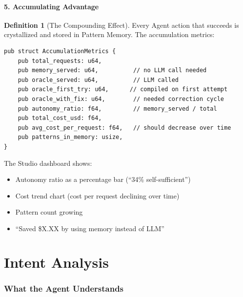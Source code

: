 \documentclass[11pt,a4paper,twoside]{article}
\theoremstyle{definition}
\newtheorem{definition}{Definition}[section]
\theoremstyle{remark}
\begin{document}
\subsection{5. Accumulating Advantage}\label{sec:accumulate}

\begin{definition}[The Compounding Effect]\label{def:compound}
Every Agent action that succeeds is crystallized and stored in
Pattern Memory. The accumulation metrics:

\begin{lstlisting}
pub struct AccumulationMetrics {
    pub total_requests: u64,
    pub memory_served: u64,          // no LLM call needed
    pub oracle_served: u64,          // LLM called
    pub oracle_first_try: u64,      // compiled on first attempt
    pub oracle_with_fix: u64,        // needed correction cycle
    pub autonomy_ratio: f64,         // memory_served / total
    pub total_cost_usd: f64,
    pub avg_cost_per_request: f64,   // should decrease over time
    pub patterns_in_memory: usize,
}
\end{lstlisting}

The Studio dashboard shows:
\begin{itemize}[nosep]
  \item Autonomy ratio as a percentage bar (``34\% self-sufficient'')
  \item Cost trend chart (cost per request declining over time)
  \item Pattern count growing
  \item ``Saved \$X.XX by using memory instead of LLM''
\end{itemize}
\end{definition}


\part{Intent Analysis}\label{part:intent}

\section{What the Agent Understands}\label{sec:understands}
\end{document}
